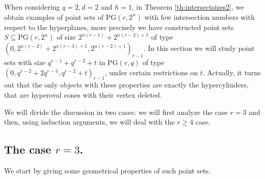 \documentclass[11pt]{amsart}
\newcommand{\PG}{\mathrm{PG}}
\begin{document}
When considering $q=2,d=2$ and $h=1$, in Theorem \ref{th:intersectsizes2}, we obtain examples of point sets of $\PG(r,2^n)$ with few intersection numbers with respect to the hyperplanes, more precisely we have constructed point sets $S \subseteq \PG(r,2^n)$ of size $2^{n(r-1)}+2^{n(r-2)+1}$ of type $(0,2^{n(r-2)}+2^{n(r-3)+1},2^{n(r-2)+1})_{r-1}$.
In this section we will study point sets with size $q^{r-1}+q^{r-2}+t$ in $\PG(r,q)$ of type $(0,q^{r-2}+2q^{r-3},q^{r-2}+t)_{r-1}$, under certain restrictions on $t$. Actually, it turns out that the only objects with these properties are exactly the hypercylinders, that are hyperoval cones with their vertex deleted.

We will divide the discussion in two cases: we will first analyze the case $r=3$ and then, using induction arguments, we will deal with the $r \geq 4$ case. 
\subsection{\texorpdfstring{The case $r=3$.}{The case r=3.}}
We start by giving some geometrical properties of such point sets.
\end{document}
